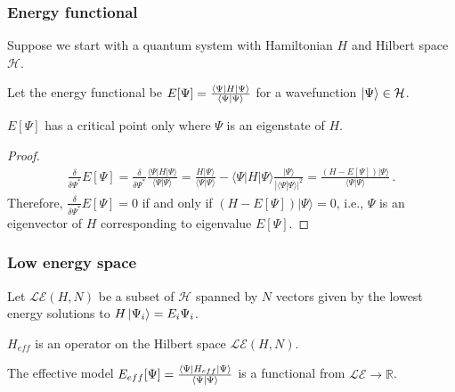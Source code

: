 \documentclass[aps, prb, 11pt]{revtex4-1}
\begin{document}
\subsubsection{Energy functional}
Suppose we start with a quantum system with Hamiltonian $H$ and Hilbert space ${\mathcal H}$.

\begin{definition}
Let the energy functional be $E[\Psi] = \frac{\bra{\Psi}H\ket{\Psi}}{\braket{\Psi|\Psi}}$ for a wavefunction $\ket{\Psi} \in {\mathcal H}$.
\end{definition}


\begin{theorem}
\label{theorem:criticalpoint}
$E[\Psi]$ has a critical point only where $\Psi$ is an eigenstate of $H$.
\end{theorem}
\begin{proof}
\begin{eqnarray}
\frac{\delta }{\delta \Psi^*}  E[\Psi] = \frac{\delta}{\delta \Psi^*}\frac{\langle \Psi |H|\Psi\rangle}{\langle \Psi |\Psi\rangle} = \frac{H|\Psi\rangle}{\langle \Psi |\Psi\rangle} - \langle \Psi |H|\Psi\rangle \frac{|\Psi \rangle}{|\langle \Psi | \Psi\rangle|^2} =\frac{ (H-E[\Psi])|\Psi\rangle }{\langle\Psi|\Psi\rangle}\,.
\end{eqnarray}
Therefore, 
$\frac{\delta }{\delta \Psi^*}  E[\Psi] = 0$ if and only if $(H-E[\Psi])|\Psi\rangle =0$, i.e., $\Psi$ is an eigenvector of $H$ corresponding to eigenvalue $E[\Psi]$.  
\end{proof}

\subsubsection{Low energy space} 

\begin{definition}
Let $\mathcal{LE}(H,N)$ be a subset of ${\mathcal H}$ spanned by $N$ vectors given by the lowest energy solutions to $H\ket{\Psi_i}=E_i{\Psi_i}$. 
\end{definition}

\begin{definition}
$H_{eff}$ is an operator on the Hilbert space ${\mathcal {LE}(H,N)}$.	 
\end{definition}

\begin{definition}
The effective model $E_{eff}[\Psi]=\frac{\bra{\Psi}H_{eff}\ket{\Psi}}{\braket{\Psi|\Psi}}$ is a functional from $\mathcal{LE} \rightarrow \mathbb{R}$. 
\end{definition}
\end{document}
